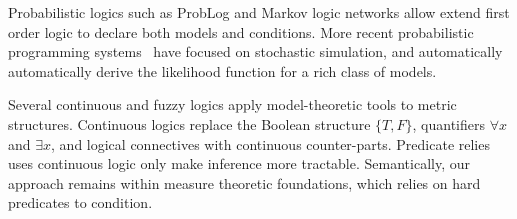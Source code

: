 Probabilistic logics such as ProbLog \cite{richardson2006markov} and Markov logic networks \cite{de2007problog} allow extend first order logic to declare both models and conditions.
More recent probabilistic programming systems~\citep{milch20071, wood2014new,mansinghka2014venture,goodman2008church,carpenter2017stan} have focused on stochastic simulation, and automatically automatically derive the likelihood function for a rich class of models.



Several continuous \cite{levin2000continuous} and fuzzy \cite{klir1995fuzzy} logics apply model-theoretic tools to metric structures.
Continuous logics replace the Boolean structure $\{T, F\}$, quantifiers $\forall x$ and $\exists x$, and logical connectives with continuous counter-parts.
Predicate relies uses continuous logic only make inference more tractable. Semantically, our approach remains within measure theoretic foundations, which relies on hard predicates to condition.



